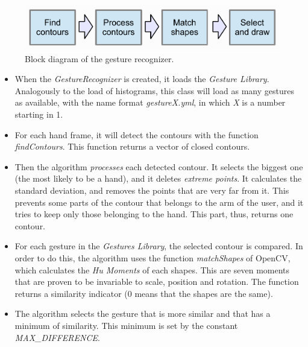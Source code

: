 \documentclass[11pt,a4paper]{article}
\begin{document}
\begin{figure}[tbh]
\centering
\includegraphics[width=13cm]{images/gesture_recognizer}
\caption{Block diagram of the gesture recognizer.}
\label{gesture_recognizer}
\end{figure}


\begin{itemize}
\item When the \textit{GestureRecognizer} is created, it loads the \textit{Gesture Library}. Analogously to the load of histograms, this class will load as many gestures as available, with the name format \textit{gestureX.yml}, in which \textit{X} is a number starting in 1.

\item For each hand frame, it will detect the contours with the function \textit{findContours}. This function returns a vector of closed contours.

\item Then the algorithm \textit{processes} each detected contour. It selects the biggest one (the most likely to be a hand), and it deletes \textit{extreme points}. It calculates the standard deviation, and removes the points that are very far from it. This prevents some parts of the contour that belongs to the arm of the user, and it tries to keep only those belonging to the hand. This part, thus, returns one contour.

\item For each gesture in the \textit{Gestures Library}, the selected contour is compared. In order to do this, the algorithm uses the function \textit{matchShapes} of OpenCV, which calculates the \textit{Hu Moments} of each shapes. This are seven moments that are proven to be invariable to scale, position and rotation. The function returns a similarity indicator (0 means that the shapes are the same).

\item The algorithm selects the gesture that is more similar and that has a minimum of similarity. This minimum is set by the constant \textit{MAX\_DIFFERENCE}.\\

\end{itemize}

\bigskip
\end{document}
